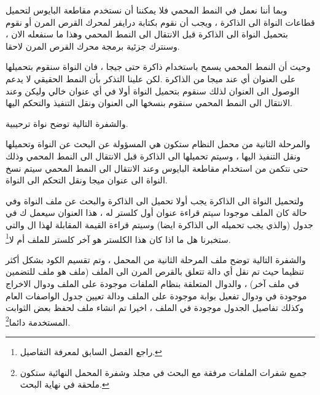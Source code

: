 \documentclass[document.tex]{subfiles}
\begin{document}
وبما أننا نعمل في النمط المحمي  فلا يمكننا أن نستخدم مقاطعة البايوس  لتحميل قطاعات النواة الى الذاكرة ، ويجب أن نقوم بكتابة درايفر لمحرك القرص المرن أو نقوم بتحميل النواة الى الذاكرة قبل الانتقال الى النمط المحمي وهذا ما سنفعله الان ، وسنترك جزئية برمجة محرك القرص المرن لاحقا.

وحيث أن النمط المحمي يسمح باستخدام ذاكرة حتى  جيجا ، فان النواة سنقوم بتحميلها على العنوان  أي عند  ميجا من الذاكرة .لكن علينا التذكر بأن النمط الحقيقي لا يدعم الوصول الى العنوان  لذلك سنقوم بتحميل النواة أولا في أي عنوان خالي وليكن  وعند الانتقال الى النمط المحمي سنقوم بنسخها الى العنوان  ونقل التنفيذ والتحكم اليها.

والشفرة التالية توضح نواة ترحيبية.

\begin{english}
\lstset{numberstyle=\tiny,numbers=left,stepnumber=1,numbersep=5pt,tabsize=2,extendedchars=true,breaklines=true,frame=b,showspaces=false, showtabs=false,xleftmargin=10pt,framexleftmargin=10pt,framexrightmargin=5pt,framexbottommargin=4pt,showstringspaces=false,language=[x86masm]Assembler}


\end{english}

والمرحلة الثانية من محمل النظام ستكون هي المسؤولة عن البحث عن النواة وتحميلها ونقل التنفيذ اليها ، وسيتم تحميلها الى الذاكرة قبل الانتقال الى النمط المحمي وذلك حتى نتكمن من استخدام مقاطعة البايوس  وعند الانتقال الى النمط المحمي سيتم نسخ النواة الى عنوان  ميجا ونقل التحكم الى النواة.

ولتحميل النواة الى الذاكرة يجب أولا تحميل  الى الذاكرة والبحث عن ملف النواة وفي حالة كان الملف موجودا سيتم قراءة عنوان أول كلستر له ، هذا العنوان سيعمل ك  في جدول  (والذي يجب تحميله الى الذاكرة ايضا) وسيتم قراءة القيمة المقابلة لهذا ال  والتي ستخبرنا هل ما اذا كان هذا الكلستر هو آخر كلستر للملف أم لا\footnote{راجع الفصل السابق لمعرفة التفاصيل.}.

والشفرة التالية توضح ملف المرحلة الثانية من المحمل  ، وتم تقسيم الكود بشكل أكثر تنظيما حيث تم نقل أي دالة تتعلق بالقرص المرن الى الملف  (ملف  هو ملف للتضمين في ملف آخر) ، والدوال المتعلقة بنظام الملفات موجودة على الملف  ودوال الاخراج موجودة في  ودوال تفعيل بوابة  موجودة على الملف  ودالة تعيين جدول الواصفات العام وكذلك تفاصيل الجدول موجودة في الملف  ، اخيرا تم انشاء ملف  لحفظ بعض الثوابت المستخدمة دائما\footnote{جميع شفرات الملفات مرفقة مع البحث في مجلد  وشفرة المحمل النهائية ستكون ملحقة في نهاية البحث.}.
\end{document}
